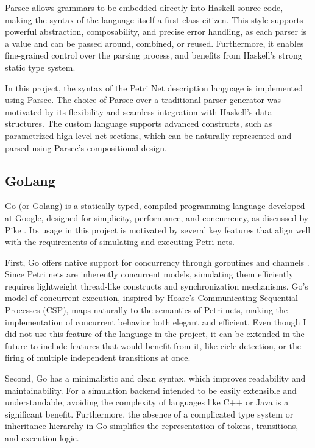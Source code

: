 \documentclass[12pt]{article}
\begin{document}
        Parsec allows grammars to be embedded directly into Haskell source code, making the syntax of the language itself a first-class citizen. This style supports powerful abstraction, composability, and precise error handling, as each parser is a value and can be passed around, combined, or reused. Furthermore, it enables fine-grained control over the parsing process, and benefits from Haskell’s strong static type system.
        
        In this project, the syntax of the Petri Net description language is implemented using Parsec. The choice of Parsec over a traditional parser generator was motivated by its flexibility and seamless integration with Haskell’s data structures. The custom language supports advanced constructs, such as parametrized high-level net sections, which can be naturally represented and parsed using Parsec’s compositional design.
        
    \subsection{GoLang}
    Go (or Golang) is a statically typed, compiled programming language developed at Google, designed for simplicity, performance, and concurrency, as discussed by Pike \cite{pike2012go}. Its usage in this project is motivated by several key features that align well with the requirements of simulating and executing Petri nets.

    First, Go offers native support for concurrency through goroutines and channels \cite{pike2012go}. Since Petri nets are inherently concurrent models, simulating them efficiently requires lightweight thread-like constructs and synchronization mechanisms. Go’s model of concurrent execution, inspired by Hoare’s Communicating Sequential Processes (CSP), maps naturally to the semantics of Petri nets, making the implementation of concurrent behavior both elegant and efficient.
    Even though I did not use this feature of the language in the project, it can be extended in the future to include features that would benefit from it, like cicle detection, or the firing of multiple independent transitions at once.

    Second, Go has a minimalistic and clean syntax, which improves readability and maintainability. For a simulation backend intended to be easily extensible and understandable, avoiding the complexity of languages like C++ or Java is a significant benefit. Furthermore, the absence of a complicated type system or inheritance hierarchy in Go simplifies the representation of tokens, transitions, and execution logic.
\end{document}
